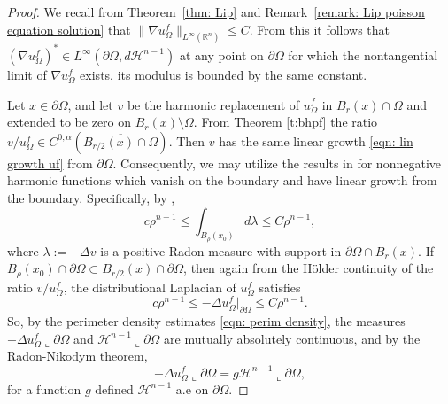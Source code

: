 \documentclass[10pt, reqno]{amsart}
\numberwithin{equation}{section}
\def\W{\Omega}
\def\na{\nabla}
\begin{document}
\begin{proof}
 We recall from Theorem~\ref{thm: Lip} and Remark~\ref{remark: Lip poisson equation solution} that $\| \nabla u_{\W}^f \|_{L^{\infty}(\mathbb{R}^n)} \leq C$. From this it follows that $(\na u_\W^f)^*\in L^\infty(\partial \W, d\mathcal{H}^{n-1})$ at any point on $\partial \W$ for which the nontangential limit of $\nabla u_{\W}^f$ exists, its modulus is bounded by the same constant. 
 
 Let $x \in \partial \Omega$, and let $v$ be the harmonic replacement of $u_{\W}^f$ in $B_r(x)\cap \Omega$ and extended to be zero on $B_r(x) \setminus \W$. From Theorem \ref{t:bhpf}  the ratio $v/u_{\W}^f \in C^{0,\alpha}(\overline{B_{r/2}(x)\cap \Omega})$. Then $v$ has the same linear growth \eqref{eqn: lin growth uf} from $\partial \Omega$. Consequently, we may utilize the results in \cite{AC81} for nonnegative harmonic functions which vanish on the boundary and have linear growth from the boundary. Specifically, by  \cite[Remark 4.2 and Theorem 4.3]{AC81},
 \[
 c\rho^{n-1} \leq \int_{B_{\rho}(x_0)} d \lambda \leq C \rho^{n-1},
 \]
 where $\lambda := -\Delta v$
 is a positive Radon measure with support in $\partial \W \cap B_{r}(x)$. If $B_{\rho}(x_0)\cap \partial \W \subset B_{r/2}(x) \cap \partial \W$, then again from the H\"older continuity of the ratio $v/u_{\W}^f$, the distributional Laplacian 
of $ u_{\W}^f$ satisfies 
 \begin{equation}\label{eqn: estimates for laplacian}
  c\rho^{n-1}\leq -\Delta u_{\W}^f |_{\partial \W} \leq C\rho^{n-1}.
  \end{equation}
 So, by the perimeter density estimates \eqref{eqn: perim density}, the measures $-\Delta u_\W^f\llcorner{\partial \Omega}$ and $\mathcal{H}^{n-1}\llcorner{\partial \W}$ are mutually absolutely continuous, and by the Radon-Nikodym theorem, 
 \begin{equation}\label{eqn: denisty of laplacian}
 -\Delta u_{\Omega}^f \llcorner{\partial \Omega} = g \mathcal{H}^{n-1}\llcorner{\partial \W},
  \end{equation}
for a function  $g$ defined $\mathcal{H}^{n-1}$ a.e on $\partial \W$.


\end{proof}
\end{document}

